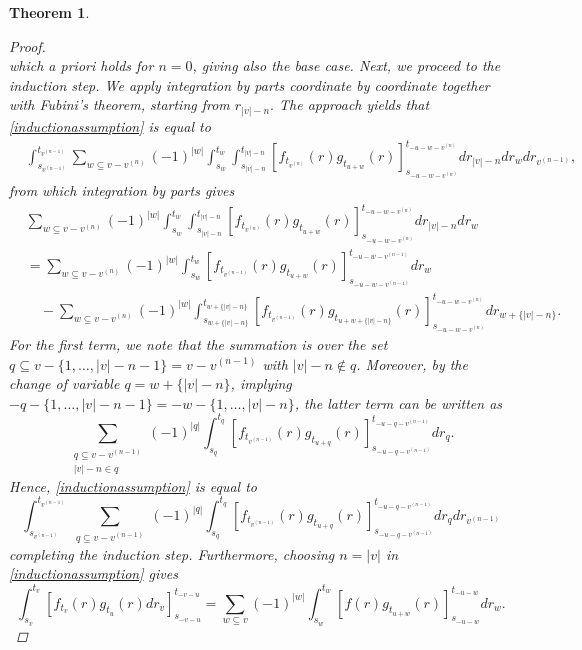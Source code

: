 \documentclass[english, a4paper, 12pt,reqno]{amsart}
\newtheorem{theorem}[defi]{Theorem}
\begin{document}
\begin{theorem}
\begin{proof}
\begin{equation}
\end{equation}
which a priori holds for $n=0$, giving also the base case. Next, we proceed to the induction step. We apply integration by parts coordinate by coordinate together with Fubini's theorem, starting from $r_{|v|-n}.$ The approach yields that \eqref{inductionassumption} is equal to
\begin{equation*}
\begin{split}
  &\int_{s_{v^{(n-1)}}}^{t_{v^{(n-1)}}} \sum_{w\subseteq v- v^{(n)}} (-1)^{|w|} \int_{s_w}^{t_w}\int_{s_{|v|-n}}^{t_{|v|-n}}\left[f_{t_{v^{(n)}}}(r) g_{t_{u+w}}(r)\right]_{s_{-u-w-v^{(n)}}}^{t_{-u-w-v^{(n)}}}dr_{|v|-n}dr_w dr_{v^{(n-1)}},
  \end{split}
\end{equation*}
from which integration by parts gives
\begin{equation*}
\begin{split}
&\sum_{w\subseteq v- v^{(n)}} (-1)^{|w|} \int_{s_w}^{t_w}\int_{s_{|v|-n}}^{t_{|v|-n}}\left[f_{t_{v^{(n)}}}(r) g_{t_{u+w}}(r)\right]_{s_{-u-w-v^{(n)}}}^{t_{-u-w-v^{(n)}}}dr_{|v|-n}dr_w\\
  & =\sum_{w\subseteq v- v^{(n)}} (-1)^{|w|} \int_{s_w}^{t_w}\left[f_{t_{{v^{(n-1)}}}}(r) g_{t_{u+w}}(r)\right]_{s_{-u-w-{v^{(n-1)}}}}^{t_{-u-w-{v^{(n-1)}}}}dr_w \\
  &\quad - \sum_{w\subseteq v- v^{(n)}} (-1)^{|w|} \int_{s_{w+\{|v|-n\}}}^{t_{w+\{|v|-n\}}}\left[f_{t_{{v^{(n-1)}}}}(r) g_{t_{u+w+\{|v|-n\}}}(r)\right]_{s_{-u-w-v^{(n)}}}^{t_{-u-w-v^{(n)}}}dr_{w+\{|v|-n\}} . 
  \end{split}
\end{equation*}
For the first term, we note that the summation is over the set $q\subseteq v - \{1,\dots,|v|-n-1\} = v-v^{(n-1)}$ with $|v| -n \notin q$. Moreover, by the change of variable $q=w+\{|v|-n\}$, implying $-q - \{1,\dots,|v|-n-1\}= -w-\{1,\dots,|v|-n\}$, the latter term can be written as
$$\sum_{\substack{q\subseteq v- v^{(n-1)}\\ |v|-n \in q}} (-1)^{|q|} \int_{s_q}^{t_q}\left[f_{t_{v^{(n-1)}}}(r) g_{t_{u+q}}(r)\right]_{s_{-u-q-v^{(n-1)}}}^{t_{-u-q-v^{(n-1)}}}dr_q .$$
Hence, \eqref{inductionassumption} is equal to
$$\int_{s_{v^{(n-1)}}}^{t_{v^{(n-1)}}} \sum_{\substack{q\subseteq v- v^{(n-1)}}} (-1)^{|q|} \int_{s_q}^{t_q}\left[f_{t_{v^{(n-1)}}}(r) g_{t_{u+q}}(r)\right]_{s_{-u-q-v^{(n-1)}}}^{t_{-u-q-v^{(n-1)}}}dr_q dr_{v^{(n-1)}} $$
completing the induction step. Furthermore, choosing $n = |v|$ in \eqref{inductionassumption} gives
$$\int_{s_v}^{t_v} \left[ f_{t_v}(r) g_{t_u}(r) dr_v\right]_{s_{-v-u}}^{t_{-v-u}}= \sum_{w\subseteq v} (-1)^{|w|} \int_{s_w}^{t_w} \left[f(r) g_{t_{u+w}}(r)\right]_{s_{-u-w}}^{t_{-u-w}} dr_w.$$

\end{proof}
\end{theorem}
\end{document}

